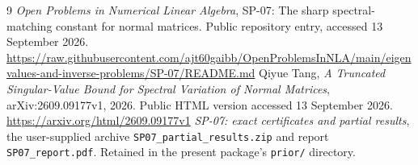 \documentclass[11pt,letterpaper]{article}
\theoremstyle{remark}\newtheorem{remark}[theorem]{Remark}
\begin{document}
\begin{thebibliography}{9}
\emph{Open Problems in Numerical Linear Algebra}, SP-07: The sharp spectral-matching constant for normal matrices. Public repository entry, accessed 13 September 2026.\\
\url{https://raw.githubusercontent.com/ajt60gaibb/OpenProblemsInNLA/main/eigenvalues-and-inverse-problems/SP-07/README.md}
Qiyue Tang, \emph{A Truncated Singular-Value Bound for Spectral Variation of Normal Matrices}, arXiv:2609.09177v1, 2026. Public HTML version accessed 13 September 2026.\\
\url{https://arxiv.org/html/2609.09177v1}
\emph{SP-07: exact certificates and partial results}, the user-supplied archive \texttt{SP07\_partial\_results.zip} and report \texttt{SP07\_report.pdf}. Retained in the present package's \texttt{prior/} directory.
\end{thebibliography}
\end{document}
